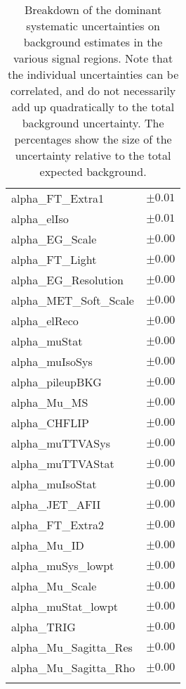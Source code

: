 \begin{table}
\begin{center}
\begin{tabular*}{\textwidth}{@{\extracolsep{\fill}}lc}
alpha\_FT\_Extra1         & $\pm 0.01$       \\
alpha\_elIso         & $\pm 0.01$       \\
alpha\_EG\_Scale         & $\pm 0.00$       \\
alpha\_FT\_Light         & $\pm 0.00$       \\
alpha\_EG\_Resolution         & $\pm 0.00$       \\
alpha\_MET\_Soft\_Scale         & $\pm 0.00$       \\
alpha\_elReco         & $\pm 0.00$       \\
alpha\_muStat         & $\pm 0.00$       \\
alpha\_muIsoSys         & $\pm 0.00$       \\
alpha\_pileupBKG         & $\pm 0.00$       \\
alpha\_Mu\_MS         & $\pm 0.00$       \\
alpha\_CHFLIP         & $\pm 0.00$       \\
alpha\_muTTVASys         & $\pm 0.00$       \\
alpha\_muTTVAStat         & $\pm 0.00$       \\
alpha\_muIsoStat         & $\pm 0.00$       \\
alpha\_JET\_AFII         & $\pm 0.00$       \\
alpha\_FT\_Extra2         & $\pm 0.00$       \\
alpha\_Mu\_ID         & $\pm 0.00$       \\
alpha\_muSys\_lowpt         & $\pm 0.00$       \\
alpha\_Mu\_Scale         & $\pm 0.00$       \\
alpha\_muStat\_lowpt         & $\pm 0.00$       \\
alpha\_TRIG         & $\pm 0.00$       \\
alpha\_Mu\_Sagitta\_Res         & $\pm 0.00$       \\
alpha\_Mu\_Sagitta\_Rho         & $\pm 0.00$       \\
\noalign{\smallskip}\hline\noalign{\smallskip}
\end{tabular*}
\end{center}
\caption[Breakdown of uncertainty on background estimates]{
Breakdown of the dominant systematic uncertainties on background estimates in the various signal regions.
Note that the individual uncertainties can be correlated, and do not necessarily add up quadratically to 
the total background uncertainty. The percentages show the size of the uncertainty relative to the total expected background.
\label{table.results.bkgestimate.uncertainties.Rpc2L2bH}}
\end{table}
\clearpage
%